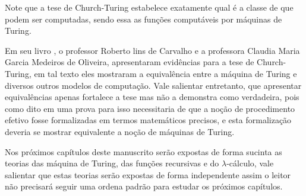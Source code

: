 \begin{rema}
	Note que a tese de Church-Turing estabelece exatamente qual é a classe de que podem ser computadas, sendo essa as funções computáveis por máquinas de Turing.
\end{rema}

Em seu livro \cite{roberto1998}, o professor Roberto lins de Carvalho e a professora Claudia Maria Garcia Medeiros de Oliveira, apresentaram evidências para a tese de Church-Turing, em tal texto eles mostraram a equivalência entre a máquina de Turing e diversos outros modelos de computação. Vale salientar entretanto, que apresentar equivalências apenas fortalece a tese mas não a demonstra como verdadeira, pois como dito em \cite{benjaLivro2010, roberto1998, sernadas2006} uma prova para isso necessitaria de que a noção de procedimento efetivo fosse formalizadas em termos matemáticos precisos, e esta formalização deveria se mostrar equivalente a noção de máquinas de Turing.

Nos próximos capítulos deste manuscrito serão expostas de forma sucinta as teorias das máquina de Turing, das funções recursivas e do $\lambda$-cálculo, vale salientar que estas teorias serão expostas de forma independente assim o leitor não precisará seguir uma ordena padrão para estudar os próximos capítulos. 